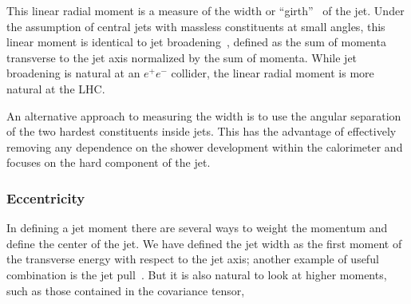 This linear radial moment is a measure of the width or ``girth''~\cite{PhysRevLett.105.022001} of the jet.  Under the assumption of central jets with massless constituents at small angles, this linear moment is identical to jet broadening~\cite{Catani1992269}, defined as the sum of momenta transverse to the jet axis normalized by the sum of momenta. While jet broadening is natural at an $e^+ e^-$ collider, the linear radial moment is more natural at the LHC.

An alternative approach to measuring the width is to use the angular separation of the two hardest constituents inside jets. This has the advantage of effectively removing any dependence on the shower development within the calorimeter and focuses on the hard component of the jet.







\subsubsection{Eccentricity}

In defining a jet moment there are several ways to weight the momentum and define the center of the jet. We have defined the jet width as the first moment of the transverse energy with respect to the jet axis; another example of useful combination is the jet pull~\cite{PhysRevLett.105.022001}. But it is also natural to look at higher moments, such as those contained in the covariance tensor,

